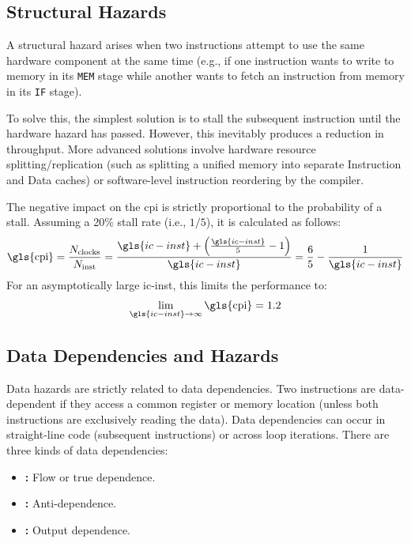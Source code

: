 \subsection{Structural Hazards}
A structural hazard arises when two instructions attempt to use the same hardware component at the same time (e.g., if one instruction wants to write to memory in its \texttt{MEM} stage while another wants to fetch an instruction from memory in its \texttt{IF} stage). 

To solve this, the simplest solution is to stall the subsequent instruction until the hardware hazard has passed. However, this inevitably produces a reduction in throughput. More advanced solutions involve hardware resource splitting/replication (such as splitting a unified memory into separate Instruction and Data caches) or software-level instruction reordering by the compiler. 

The negative impact on the \gls{cpi} is strictly proportional to the probability of a stall. Assuming a 20\% stall rate (i.e., $1/5$), it is calculated as follows:
\[
    \text{\gls{cpi}} = \frac{N_{\text{clocks}}}{N_{\text{inst}}} = \frac{\gls{ic-inst} + \left(\frac{\gls{ic-inst}}{5} - 1\right)}{\gls{ic-inst}} = \frac{6}{5} - \frac{1}{\gls{ic-inst}}
\]
For an asymptotically large \gls{ic-inst}, this limits the performance to:
\[
    \lim_{\gls{ic-inst} \to \infty} \text{\gls{cpi}} = 1.2
\]

\subsection{Data Dependencies and Hazards}
Data hazards are strictly related to data dependencies. Two instructions are data-dependent if they access a common register or memory location (unless both instructions are exclusively reading the data). Data dependencies can occur in straight-line code (subsequent instructions) or across loop iterations. There are three kinds of data dependencies:
\begin{itemize}
    \item \textbf{:} Flow or true dependence.
    \item \textbf{:} Anti-dependence.
    \item \textbf{:} Output dependence.
\end{itemize}

